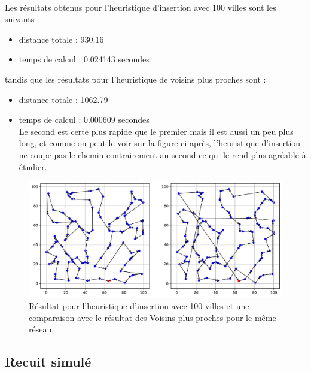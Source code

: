\documentclass[a4paper,11pt,fleqn]{article}
\begin{document}
\paragraph{}
Les résultats obtenus pour l'heuristique d'insertion avec 100 villes sont les suivants :
\begin{itemize}
    \item distance totale : 930.16
    \item temps de calcul : 0.024143 secondes
\end{itemize}
tandis que les résultats pour l'heuristique de voisins plus proches sont :
\begin{itemize}
    \item distance totale : 1062.79
    \item temps de calcul : 0.000609 secondes\\
Le second est certe plus rapide que le premier mais il est aussi un peu plus long, et comme on peut le voir sur la figure ci-après, l'heuristique d'insertion ne coupe pas le chemin contrairement au second ce qui le rend plus agréable à étudier. 
\end{itemize}
\begin{figure}[H]
    \centering
    \includegraphics[width=\textwidth]{images/insertion_100_villes_nn.pdf}
    \caption{Résultat pour l'heuristique d'insertion avec 100 villes et une comparaison avec le résultat des Voisins plus proches pour le même réseau.}
    \label{fig:insert-100}
\end{figure}

\subsection*{Recuit simulé}
\end{document}

